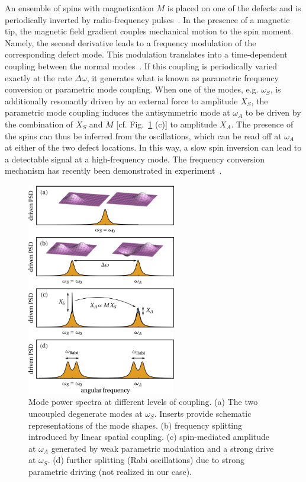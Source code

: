 An ensemble of spins with magnetization $M$ is placed on one of the defects and is periodically inverted by radio-frequency pulses~\cite{Degen_2009}. In the presence of a magnetic tip, the magnetic field gradient couples mechanical motion to the spin moment. Namely, the second derivative leads to a frequency modulation of the corresponding defect mode. This modulation translates into a time-dependent coupling between the normal modes~\cite{Frimmer_2014}. If this coupling is periodically varied exactly at the rate $\Delta \omega$, it generates what is known as parametric frequency conversion or parametric mode coupling. When one of the modes, e.g. $\omega_S$, is additionally resonantly driven by an external force to amplitude $X_S$, the parametric mode coupling induces the antisymmetric mode at $\omega_A$ to be driven by the combination of $X_S$ and $M$ [cf. Fig.~\ref{fig:splittings} (c)] to amplitude $X_A$. The presence of the spins can thus be inferred from the oscillations, which can be read off at $\omega_A$ at either of the two defect locations. In this way, a slow spin inversion can lead to a detectable signal at a high-frequency mode. The frequency conversion mechanism has recently been demonstrated in experiment~\cite{Haelg_2022}. 

\begin{figure} [ht!] 
	\centering
	\includegraphics[width=65mm]{figures/spins/fig2.png}
	\caption{Mode power spectra at different levels of coupling. (a) The two uncoupled degenerate modes at $\omega_S$. Inserts provide schematic representations of the mode shapes. (b) frequency splitting introduced by linear spatial coupling. (c) spin-mediated amplitude at $\omega_A$ generated by weak parametric modulation and a strong drive at $\omega_S$. (d) further splitting (Rabi oscillations) due to strong parametric driving (not realized in our case).}
	\label{fig:splittings}
\end{figure}


